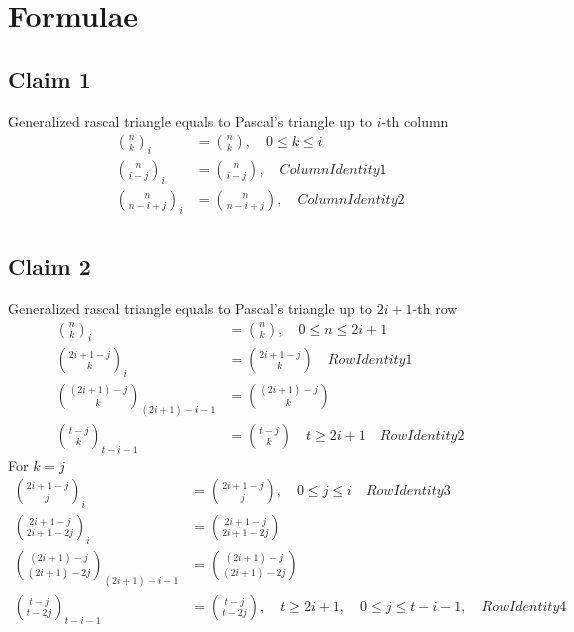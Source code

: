 \documentclass[12pt,letterpaper,oneside,reqno]{amsart}
\newcommand \rascalNumber [3] {\binom{#1}{#2}_{#3}}
\numberwithin{equation}{section}
\begin{document}
\section{Formulae}\label{sec:formulae}

\subsection{Claim 1} Generalized rascal triangle equals to Pascal's triangle up to $i$-th column
\begin{align}
    \rascalNumber{n}{k}{i}          &= \binom{n}{k}, \quad 0 \leq k \leq i \\
    \rascalNumber{n}{i-j}{i}        &= \binom{n}{i-j}, \quad ColumnIdentity1 \\
    \rascalNumber{n}{n-i+j}{i}      &= \binom{n}{n-i+j}, \quad ColumnIdentity2 \\
\end{align}

\subsection{Claim 2} Generalized rascal triangle equals to Pascal's triangle up to $2i+1$-th row
\begin{align}
    \rascalNumber{n}{k}{i}                  &= \binom{n}{k}, \quad 0 \leq n \leq 2i+1 \\
    \rascalNumber{2i+1-j}{k}{i}             &= \binom{2i+1-j}{k} \quad RowIdentity1 \\
    \rascalNumber{(2i+1)-j}{k}{(2i+1)-i-1}  &= \binom{(2i+1)-j}{k} \\
    \rascalNumber{t-j}{k}{t-i-1}            &= \binom{t-j}{k} \quad t \geq 2i+1 \quad RowIdentity2
\end{align}
For $k=j$
\begin{align*}
    \rascalNumber{2i+1-j}{j}{i}         &= \binom{2i+1-j}{j}, \quad 0 \leq j \leq i \quad RowIdentity3 \\
    \rascalNumber{2i+1-j}{2i+1-2j}{i}   &= \binom{2i+1-j}{2i+1-2j} \\
    \rascalNumber{(2i+1)-j}{(2i+1)-2j}{(2i+1)-i-1}   &= \binom{(2i+1)-j}{(2i+1)-2j} \\
    \rascalNumber{t-j}{t-2j}{t-i-1}     &= \binom{t-j}{t-2j}, \quad t \geq 2i+1, \quad 0 \leq j \leq t-i-1, \quad RowIdentity4 \\
\end{align*}
\end{document}
